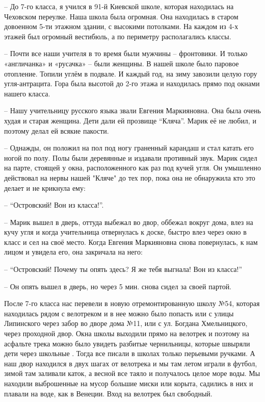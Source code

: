 – До 7-го класса, я учился в 91-й Киевской школе, которая находилась на
Чеховском переулке. Наша школа была огромная. Она находилась в старом довоенном
5-ти этажном здании, с высокими потолками. На каждом из 4-х этажей был огромный
вестибюль, а по периметру располагались классы.

– Почти все наши учителя в то время были мужчины – фронтовики. И только
«англичанка» и «русачка» – были женщины. В нашей школе было паровое отопление.
Топили углём в подвале. И каждый год, на зиму завозили целую гору
угля-антрацита. Гора была высотой до 2-го этажа и находилась прямо под окнами
нашего класса.

– Нашу учительницу русского языка звали Евгения Маркияновна. Она была очень
худая и старая женщина. Дети дали ей прозвище “Кляча”. Марик её не любил, и
поэтому делал ей всякие пакости.

– Однажды, он положил на пол под ногу граненный карандаш и стал катать его
ногой по полу. Полы были деревянные и издавали противный звук. Марик сидел на
парте, стоящей у окна, расположенного как раз под кучей угля. Он умышленно
действовал на нервы нашей "Кляче" до тех пор, пока она не обнаружила кто это
делает и не крикнула ему:

– “Островский! Вон из класса!”.

– Марик вышел в дверь, оттуда выбежал во двор, оббежал вокруг дома, влез на
кучу угля и когда учительница отвернулась к доске, быстро влез через окно в
класс и сел на своё место. Когда Евгения Маркияновна снова повернулась, к нам
лицом и увидела его,  она закричала на него:

– “Островский! Почему ты опять здесь? Я же тебя выгнала!  Вон из класса!”

– Он опять вышел в дверь, но через 5 мин. снова сидел за своей партой.

После 7-го класса нас перевели в новую отремонтированную школу №54, которая
находилась рядом с велотреком и в нее можно было попасть или с улицы Липинского
через забор во дворе дома №11, или с ул. Богдана Хмельницкого, через проходной
двор. Окна школы выходили прямо на велотрек и поэтому  на асфальте трека можно
было увидеть разбитые чернильницы, которые швыряли дети через  школьные . Тогда
все писали в школах только перьевыми ручками. А наш двор находился в двух шагах
от велотрека и мы там летом играли в футбол, зимой там заливали каток, а весной
все таяло и получалось целое море воды.  Мы находили выброшенные на мусор
большие миски или корыта, садились в них и плавали на воде, как в Венеции. Вход
на велотрек был свободный.

